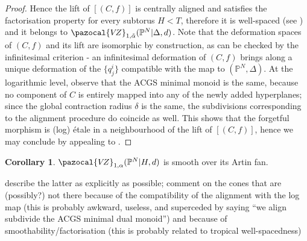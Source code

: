 \documentclass[11pt]{amsart}
\newcommand{\PP}{\mathbb P}
\newcommand{\VZ}{\pazocal{V\!Z}}
\theoremstyle{definition}
\newtheorem{cor}[thm]{Corollary}
\theoremstyle{definition}
\begin{document}
\begin{proof}
 Hence the lift of $[(C,f)]$ is centrally aligned and satisfies the factorisation property for every subtorus $H<T$, therefore it is well-spaced (see \cite[Definition 3.4.2]{RSPW2}) and it belongs to $\VZ_{1,\tilde\alpha}(\PP^N|\Delta,d)$. Note that the deformation spaces of $(C,f)$ and its lift are isomorphic by construction, as can be checked by the infinitesimal criterion - an infinitesimal deformation of $(C,f)$ brings along a unique deformation of the $\{q^i_j\}$ compatible with the map to $(\PP^N,\Delta)$. At the logarithmic level, observe that the ACGS minimal monoid is the same, because no component of $C$ is entirely mapped into any of the newly added hyperplanes; since the global contraction radius $\delta$ is the same, the subdivisions corresponding to the alignment procedure do coincide as well. This shows that the forgetful morphism is (log) \'etale in a neighbourhood of the lift of $[(C,f)]$, hence we may conclude by appealing to \cite[Theorem 3.5.1]{RSPW2}.
\end{proof}

\begin{cor}\label{cor:log_smooth}
 $\VZ_{1,\alpha}(\PP^N|H,d)$ is smooth over its Artin fan.
\end{cor}

{\color{gray} describe the latter as explicitly as possible; comment on the cones that are (possibly?) not there because of the compatibility of the alignment with the log map (this is probably awkward, useless, and superceded by saying ``we align subdivide the ACGS minimal dual monoid'') and because of smoothability/factorisation (this is probably related to tropical well-spacedness)}
\end{document}
